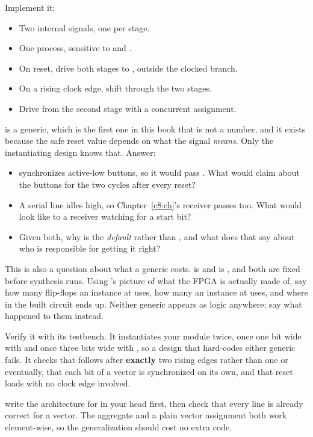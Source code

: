 \begin{parts}
  \item Implement it:
    \begin{itemize}
      \item Two internal  signals, one per stage.
      \item One process, sensitive to  and .
      \item On reset, drive both stages to , outside the clocked branch.
      \item On a rising clock edge, shift  through the two stages.
      \item Drive  from the second stage with a concurrent assignment.
    \end{itemize}
  \item {} is a  generic, which is the first one in this book that is not
    a number, and it exists because the safe reset value depends on what the signal \emph{means}.
    Only the instantiating design knows that. Answer:
    \begin{itemize}
      \item {} synchronizes active-low buttons, so it would pass . What
        would  claim about the buttons for the two cycles after every reset?
      \item A serial line idles high, so Chapter~\ref{c8:ch}'s receiver passes  too. What
        would  look like to a receiver watching for a start bit?
      \item Given both, why is the \emph{default}  rather than , and what does
        that say about who is responsible for getting it right?
    \end{itemize}
  \item This is also a question about what a generic costs.  is
     and  is , and both are fixed before
    synthesis runs. Using 's picture of what the FPGA is actually made of, say how many
    flip-flops an instance at  uses, how many an instance at  uses,
    and where in the built circuit  ends up. Neither generic appears as logic anywhere;
    say what happened to them instead.
  \item Verify it with its testbench. It instantiates your module twice, once one bit wide with
     and once three bits wide with , so a design that
    hard-codes either generic fails. It checks that  follows  after
    \textbf{exactly} two rising edges rather than one or eventually, that each bit of a vector is
    synchronized on its own, and that reset loads  with no clock edge involved.
\end{parts}
\note[Tip] write the architecture for  in your head first, then check that every line
is already correct for a vector. The aggregate  and a plain vector
assignment both work element-wise, so the generalization should cost no extra code.

